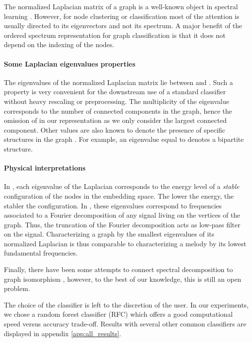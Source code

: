 \documentclass{article}
\begin{document}
The normalized Laplacian matrix of a graph is a well-known object in spectral learning \citep{belkin2002laplacian, kamvar2003spectral}. However, for node clustering or classification most of the attention is usually directed to its eigenvectors and not its spectrum. A major benefit of the ordered spectrum representation for graph classification is that it does not depend on the indexing of the nodes. 



\paragraph{Some Laplacian eigenvalues properties}
The eigenvalues of the normalized Laplacian matrix lie between  and . Such a property is very convenient for the downstream use of a standard classifier without heavy rescaling or preprocessing. The multiplicity of the eigenvalue  corresponds to the number of connected components in the graph, hence the omission of  in our representation as we only consider the largest connected component. Other values are also known to denote the presence of specific structures in the graph \citep{chung1997spectral}. For example, an eigenvalue equal to  denotes a bipartite structure.


\paragraph{Physical interpretations} In \citep{bonald2018weighted}, each eigenvalue of the Laplacian corresponds to the energy level of a \textit{stable} configuration of the nodes in the embedding space. The lower the energy, the stabler the configuration. In \citep{shuman2016vertex}, these eigenvalues correspond to frequencies associated to a Fourier decomposition of any signal living on the vertices of the graph. Thus, the truncation of the Fourier decomposition acts as low-pass filter on the signal. Characterizing a graph by the smallest eigenvalues of its normalized Laplacian is thus comparable to characterizing a melody by its lowest fundamental frequencies.

Finally, there have been some attempts to connect spectral decomposition to graph isomorphism \citep{van2003graphs, kolla2017spectral}, however, to the best of our knowledge, this is still an open problem.

The choice of the classifier is left to the discretion of the user. In our experiments, we chose a random forest classifier (RFC) which offers a good computational speed versus accuracy trade-off. Results with several other common classifiers are displayed in appendix \ref{app:all_results}. 
\end{document}
